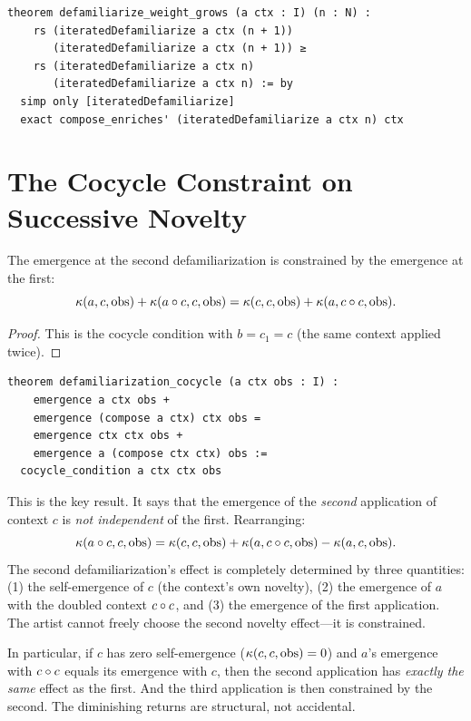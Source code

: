 \begin{lstlisting}
theorem defamiliarize_weight_grows (a ctx : I) (n : N) :
    rs (iteratedDefamiliarize a ctx (n + 1))
       (iteratedDefamiliarize a ctx (n + 1)) ≥
    rs (iteratedDefamiliarize a ctx n)
       (iteratedDefamiliarize a ctx n) := by
  simp only [iteratedDefamiliarize]
  exact compose_enriches' (iteratedDefamiliarize a ctx n) ctx
\end{lstlisting}

\section{The Cocycle Constraint on Successive Novelty}

\begin{theorem}
\label{thm:defam-cocycle}
The emergence at the second defamiliarization is constrained by the
emergence at the first:
\[
  \kappa(a, c, \mathrm{obs}) + \kappa(a \circ c, c, \mathrm{obs})
  = \kappa(c, c, \mathrm{obs}) + \kappa(a, c \circ c, \mathrm{obs}).
\]
\end{theorem}

\begin{proof}
This is the cocycle condition with $b = c_1 = c$ (the same context
applied twice).
\end{proof}

\begin{lstlisting}
theorem defamiliarization_cocycle (a ctx obs : I) :
    emergence a ctx obs +
    emergence (compose a ctx) ctx obs =
    emergence ctx ctx obs +
    emergence a (compose ctx ctx) obs :=
  cocycle_condition a ctx ctx obs
\end{lstlisting}

\begin{remark}
This is the key result.  It says that the emergence of the \emph{second}
application of context $c$ is \emph{not independent} of the first.
Rearranging:
\[
  \kappa(a \circ c, c, \mathrm{obs}) =
  \kappa(c, c, \mathrm{obs}) +
  \kappa(a, c \circ c, \mathrm{obs}) -
  \kappa(a, c, \mathrm{obs}).
\]
The second defamiliarization's effect is completely determined by three
quantities: (1) the self-emergence of $c$ (the context's own novelty),
(2) the emergence of $a$ with the doubled context $c \circ c$, and
(3) the emergence of the first application.  The artist cannot freely
choose the second novelty effect---it is constrained.

In particular, if $c$ has zero self-emergence ($\kappa(c,c,\mathrm{obs}) = 0$)
and $a$'s emergence with $c \circ c$ equals its emergence with $c$,
then the second application has \emph{exactly the same} effect as the
first.  And the third application is then constrained by the second.
The diminishing returns are structural, not accidental.
\end{remark}

